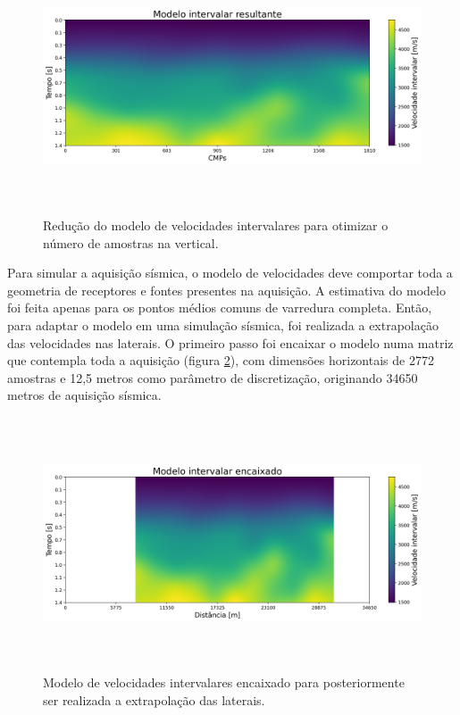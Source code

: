 \documentclass[
	12pt,				%
	openright,			%
	oneside,			%
	a4paper,			%
	english,			%
	brazil				%
	]{abntex2}
\begin{document}
    \begin{figure}[htp!]
		\centering
		\includegraphics[width=16cm,height=7.5cm]{../imagens/modeloSuavizadoINTUTIL.png}
		\caption{Redução do modelo de velocidades intervalares para otimizar o número de amostras na vertical.}
		\label{modeloSuavizadoINTUTIL}
	\end{figure}

	Para simular a aquisição sísmica, o modelo de velocidades deve comportar toda a geometria de receptores e fontes presentes na aquisição. A estimativa do modelo foi feita apenas para os pontos médios comuns de varredura completa. Então, para adaptar o modelo em uma simulação sísmica, foi realizada a extrapolação das velocidades nas laterais. O primeiro passo foi encaixar o modelo numa matriz que contempla toda a aquisição (figura \ref{modeloReduzidoINT}), com dimensões horizontais de 2772 amostras e 12,5 metros como parâmetro de discretização, originando 34650 metros de aquisição sísmica.
	
    \begin{figure}[htp!]
		\centering
		\includegraphics[width=16cm,height=7.5cm]{../imagens/modeloReduzidoINT.png}
		\caption{Modelo de velocidades intervalares encaixado para posteriormente ser realizada a extrapolação das laterais.}
		\label{modeloReduzidoINT}
	\end{figure}
\end{document}
